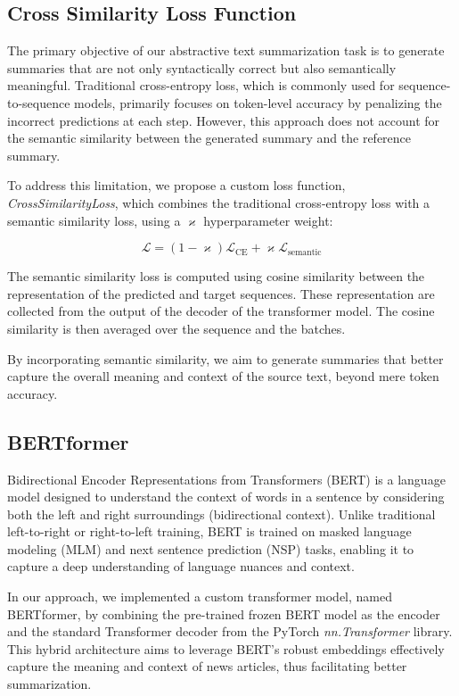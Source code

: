 \documentclass[a4paper, 11pt]{article}
\begin{document}
\subsection{Cross Similarity Loss Function}
The primary objective of our abstractive text summarization task is to generate summaries that are not only syntactically correct but also semantically meaningful. Traditional cross-entropy loss, which is commonly used for sequence-to-sequence models, primarily focuses on token-level accuracy by penalizing the incorrect predictions at each step. However, this approach does not account for the semantic similarity between the generated summary and the reference summary.

To address this limitation, we propose a custom loss function, \textit{CrossSimilarityLoss}, which combines the traditional cross-entropy loss\cite{CrossEnrtopyLoss} with a semantic similarity loss, using a $\varkappa$ hyperparameter weight:

\begin{equation}
    \mathcal{L} = (1 - \varkappa) \mathcal{L}_{\text{CE}} + \varkappa \mathcal{L}_{\text{semantic}}
\end{equation}

The semantic similarity loss is computed using cosine similarity \cite{cosineSimilarity} between the representation of the predicted and target sequences. These representation are collected from the output of the decoder of the transformer model. The cosine similarity is then averaged over the sequence and the batches.

By incorporating semantic similarity, we aim to generate summaries that better capture the overall meaning and context of the source text, beyond mere token accuracy.

\subsection{BERTformer}
Bidirectional Encoder Representations from Transformers (BERT) \cite{devlin2018bert} is a language model designed to understand the context of words in a sentence by considering both the left and right surroundings (bidirectional context). Unlike traditional left-to-right or right-to-left training, BERT is trained on masked language modeling (MLM) and next sentence prediction (NSP) tasks, enabling it to capture a deep understanding of language nuances and context.

In our approach, we implemented a custom transformer model, named BERTformer, by combining the pre-trained frozen BERT model as the encoder and the standard Transformer decoder from the PyTorch \textit{nn.Transformer} library. This hybrid architecture aims to leverage BERT's robust embeddings effectively capture the meaning and context of news articles, thus facilitating better summarization.
\end{document}
